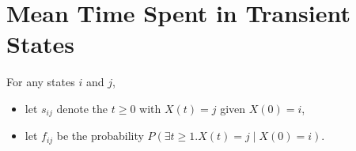 \section{Mean Time Spent in Transient States}

\begin{definition}
For any states $ i $ and $ j $,
\begin{itemize}
  \item let $ s_{ij} $ denote the  $ t \ge 0 $ with $ X(t) = j $ given $ X(0) = i $,
  \item let $ f_{ij} $ be the probability $ P(\exists t \ge 1 . X(t) = j \mid X(0) = i) $.
\end{itemize}

\begin{comment}
只需考慮 $ i \to j $ 且 $ i, j $ 都是 transient 的情況。

\begin{itemize}
  \item $ i \not\to j \Rightarrow s_{ij} = 0 $.
  \item $ i \to j \wedge i \text{ is recurrent} \Rightarrow s_{ij} = \infty $. \\
    ($ i \to j \wedge i \text{ is recurrent} \Rightarrow j \to i \Rightarrow j $ is recurrent.)
  \item $ i \to j \wedge j \text{ is recurrent} \Rightarrow s_{ij} = \infty $. \\
    (有 $ > 0 $ 的機率會回到 $ j $，且之後會一直回到 $ j $。)
\end{itemize}
\end{comment}
\end{definition}

